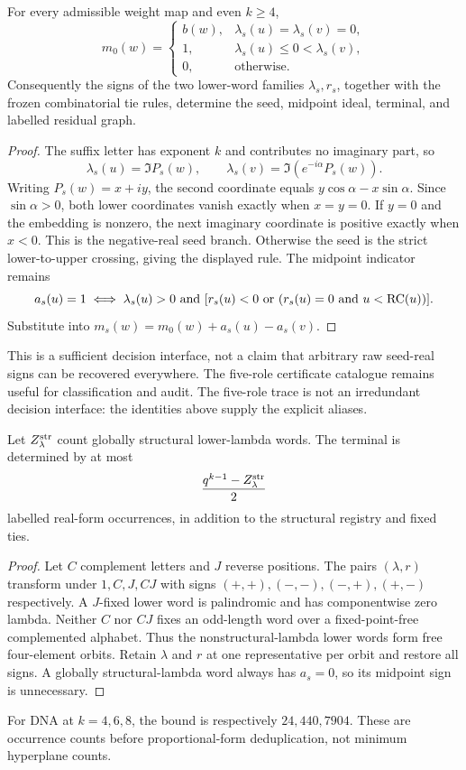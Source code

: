 \begin{theorem}\label{ext:thm:two}
For every admissible weight map and even $k\ge4$,
\[
 m_0(w)=
 \begin{cases}
 b(w),&\lambda_s(u)=\lambda_s(v)=0,\\
 1,&\lambda_s(u)\le0<\lambda_s(v),\\
 0,&\text{otherwise}.
 \end{cases}
\]
Consequently the signs of the two lower-word families $\lambda_s,r_s$, together with the frozen combinatorial tie rules, determine the seed, midpoint ideal, terminal, and labelled residual graph.
\end{theorem}
\begin{proof}
The suffix letter has exponent $k$ and contributes no imaginary part, so
\[
\lambda_s(u)=\Im P_s(w),\qquad
\lambda_s(v)=\Im(e^{-i\alpha}P_s(w)).
\]
Writing $P_s(w)=x+iy$, the second coordinate equals $y\cos\alpha-x\sin\alpha$. Since $\sin\alpha>0$, both lower coordinates vanish exactly when $x=y=0$. If $y=0$ and the embedding is nonzero, the next imaginary coordinate is positive exactly when $x<0$. This is the negative-real seed branch. Otherwise the seed is the strict lower-to-upper crossing, giving the displayed rule. The midpoint indicator remains
\[
a_s(u)=1\iff\lambda_s(u)>0\ \text{and}\
[r_s(u)<0\ \text{or}\ (r_s(u)=0\text{ and }u<\operatorname{RC}(u))].
\]
Substitute into $m_s(w)=m_0(w)+a_s(u)-a_s(v)$.
\end{proof}
This is a sufficient decision interface, not a claim that arbitrary raw seed-real signs can be recovered everywhere. The five-role certificate catalogue remains useful for classification and audit. The five-role trace is not an irredundant decision interface: the identities above supply the explicit aliases.

\begin{corollary}\label{ext:cor:compression}
Let $Z^{\rm str}_\lambda$ count globally structural lower-lambda words. The terminal is determined by at most
\[
\frac{q^{k-1}-Z^{\rm str}_\lambda}{2}
\]
labelled real-form occurrences, in addition to the structural registry and fixed ties.
\end{corollary}
\begin{proof}
Let $C$ complement letters and $J$ reverse positions. The pairs $(\lambda,r)$ transform under $1,C,J,CJ$ with signs $(+,+),(-,-),(-,+),(+,-)$ respectively. A $J$-fixed lower word is palindromic and has componentwise zero lambda. Neither $C$ nor $CJ$ fixes an odd-length word over a fixed-point-free complemented alphabet. Thus the nonstructural-lambda lower words form free four-element orbits. Retain $\lambda$ and $r$ at one representative per orbit and restore all signs. A globally structural-lambda word always has $a_s=0$, so its midpoint sign is unnecessary.
\end{proof}
For DNA at $k=4,6,8$, the bound is respectively $24,440,7904$. These are occurrence counts before proportional-form deduplication, not minimum hyperplane counts.

